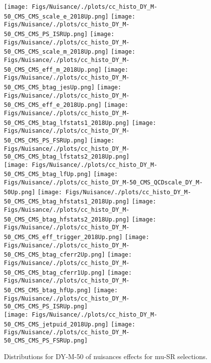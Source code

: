 \begin{figure*}[htbp]  
\centering 
\texttt{[image: Figs/Nuisance/./plots/cc\_histo\_DY\_M-50\_CMS\_CMS\_scale\_e\_2018Up.png]}
\texttt{[image: Figs/Nuisance/./plots/cc\_histo\_DY\_M-50\_CMS\_CMS\_PS\_ISRUp.png]}
\texttt{[image: Figs/Nuisance/./plots/cc\_histo\_DY\_M-50\_CMS\_CMS\_scale\_m\_2018Up.png]}
\texttt{[image: Figs/Nuisance/./plots/cc\_histo\_DY\_M-50\_CMS\_CMS\_eff\_m\_2018Up.png]}
\texttt{[image: Figs/Nuisance/./plots/cc\_histo\_DY\_M-50\_CMS\_CMS\_btag\_jesUp.png]}
\texttt{[image: Figs/Nuisance/./plots/cc\_histo\_DY\_M-50\_CMS\_CMS\_eff\_e\_2018Up.png]}
\texttt{[image: Figs/Nuisance/./plots/cc\_histo\_DY\_M-50\_CMS\_CMS\_btag\_lfstats1\_2018Up.png]}
\texttt{[image: Figs/Nuisance/./plots/cc\_histo\_DY\_M-50\_CMS\_CMS\_PS\_FSRUp.png]}
\texttt{[image: Figs/Nuisance/./plots/cc\_histo\_DY\_M-50\_CMS\_CMS\_btag\_lfstats2\_2018Up.png]}\\
\texttt{[image: Figs/Nuisance/./plots/cc\_histo\_DY\_M-50\_CMS\_CMS\_btag\_lfUp.png]}
\texttt{[image: Figs/Nuisance/./plots/cc\_histo\_DY\_M-50\_CMS\_QCDscale\_DY\_M-50Up.png]}
\texttt{[image: Figs/Nuisance/./plots/cc\_histo\_DY\_M-50\_CMS\_CMS\_btag\_hfstats1\_2018Up.png]}
\texttt{[image: Figs/Nuisance/./plots/cc\_histo\_DY\_M-50\_CMS\_CMS\_btag\_hfstats2\_2018Up.png]}
\texttt{[image: Figs/Nuisance/./plots/cc\_histo\_DY\_M-50\_CMS\_CMS\_eff\_trigger\_2018Up.png]}
\texttt{[image: Figs/Nuisance/./plots/cc\_histo\_DY\_M-50\_CMS\_CMS\_btag\_cferr2Up.png]}
\texttt{[image: Figs/Nuisance/./plots/cc\_histo\_DY\_M-50\_CMS\_CMS\_btag\_cferr1Up.png]}
\texttt{[image: Figs/Nuisance/./plots/cc\_histo\_DY\_M-50\_CMS\_CMS\_btag\_hfUp.png]}
\texttt{[image: Figs/Nuisance/./plots/cc\_histo\_DY\_M-50\_CMS\_CMS\_PS\_ISRUp.png]}\\
\texttt{[image: Figs/Nuisance/./plots/cc\_histo\_DY\_M-50\_CMS\_CMS\_jetpuid\_2018Up.png]}
\texttt{[image: Figs/Nuisance/./plots/cc\_histo\_DY\_M-50\_CMS\_CMS\_PS\_FSRUp.png]}
\\ 
\caption{ 
   Distributions for DY-M-50 of nuisances effects for mu-SR selections.
} 
\label{fig:DY_M-50_mu_SR} 
\end{figure*} 




